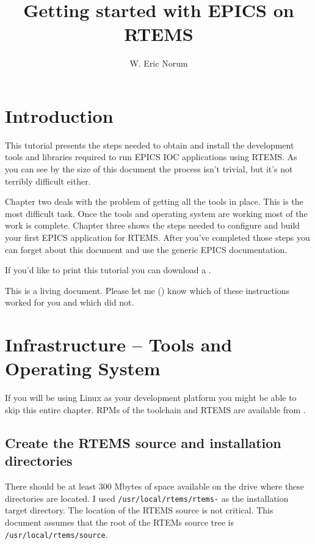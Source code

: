 \documentclass{report}
\title{Getting started with EPICS on RTEMS}
\author{W. Eric Norum}
\begin{document}
\maketitle
\newpage
{}
\tableofcontents
\newpage
{}

\chapter{Introduction}
This tutorial presents the steps needed to obtain and install
the development tools and
libraries required  to run EPICS IOC applications using RTEMS.
As you can see by the size of this document the process isn't trivial,
but it's not terribly difficult either.

Chapter two deals with the problem of getting all the tools in place.  This
is the most difficult task.  Once the tools and operating system are working
most of the work is complete.  Chapter three shows the steps needed to
configure and build your first EPICS application for RTEMS.  After you've
completed those steps you can forget about this document and use the
generic EPICS documentation.

\begin{htmlonly}
If you'd like to print this tutorial you can download a
.
\end{htmlonly}


This is a living document.  Please let me
()
know which of these instructions worked for you and which did not.


\chapter{Infrastructure -- Tools and Operating System}
If you will be using Linux as your development platform you might be able to skip this entire chapter. RPMs
of the toolchain and RTEMS are available from
.

\section{Create the RTEMS source and installation directories}
There should be at least 300 Mbytes of space available on the drive
where these directories are located.
I used {\tt /usr/local/rtems/rtems-\rtemsVersion} as the
installation target directory.
The location of the RTEMS source is not critical.  This document assumes
that the root of the RTEMs source tree is {\tt /usr/local/rtems/source}.
\end{document}
